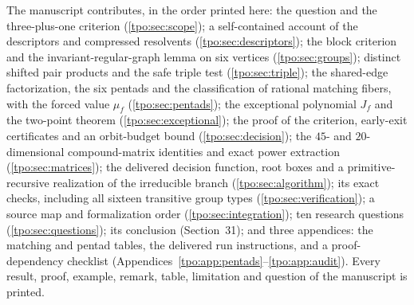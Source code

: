 \documentclass[11pt,letterpaper]{article}
\numberwithin{equation}{section}
\theoremstyle{definition}
\theoremstyle{remark}
\begin{document}
The manuscript contributes, in the order printed here: the question and the
three-plus-one criterion (\cref{tpo:sec:scope}); a self-contained account of
the descriptors and compressed resolvents (\cref{tpo:sec:descriptors}); the
block criterion and the invariant-regular-graph lemma on six vertices
(\cref{tpo:sec:groups}); distinct shifted pair products and the safe triple
test (\cref{tpo:sec:triple}); the shared-edge factorization, the six pentads
and the classification of rational matching fibers, with the forced value
$\mu_f$ (\cref{tpo:sec:pentads}); the exceptional polynomial $J_f$ and the
two-point theorem (\cref{tpo:sec:exceptional}); the proof of the criterion,
early-exit certificates and an orbit-budget bound (\cref{tpo:sec:decision});
the $45$- and $20$-dimensional compound-matrix identities and exact power
extraction (\cref{tpo:sec:matrices}); the delivered decision function, root
boxes and a primitive-recursive realization of the irreducible branch
(\cref{tpo:sec:algorithm}); its exact checks, including all sixteen
transitive group types (\cref{tpo:sec:verification}); a source map and
formalization order (\cref{tpo:sec:integration}); ten research questions
(\cref{tpo:sec:questions}); its conclusion (Section~31); and three
appendices: the matching and pentad tables, the delivered run instructions,
and a proof-dependency checklist
(Appendices~\ref{tpo:app:pentads}--\ref{tpo:app:audit}). Every result,
proof, example, remark, table, limitation and question of the manuscript is
printed.
\end{document}
